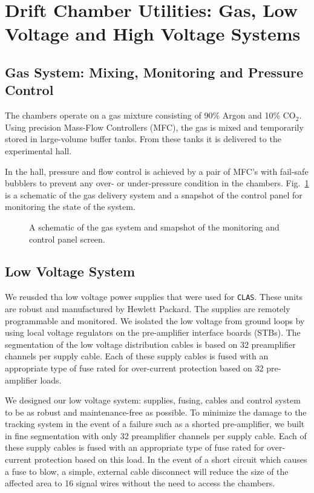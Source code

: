 \section{Drift Chamber Utilities: Gas, Low Voltage and High Voltage Systems}

\subsection{Gas System: Mixing, Monitoring and Pressure Control}

The chambers operate on a gas mixture consisting of 90\% Argon and 10\% CO$_2$.
Using precision Mass-Flow Controllers (MFC), the gas is mixed and temporarily
stored in large-volume buffer tanks.  From these tanks it is delivered
to the experimental hall.  

In the hall, pressure and flow control is achieved by a pair of MFC's with
fail-safe bubblers to prevent any over- or under-pressure condition in
the chambers.  
Fig.~\ref{dc-gas-system} is a schematic of the gas delivery system 
and a snapshot 
of the control panel for monitoring the state of the system.

\begin{figure}[htpb]   
\vspace{4.5cm}
\caption{\small{A schematic of the gas system and smapshot of the monitoring
and control panel screen.}}
\label{dc-gas-system}
\end{figure}   

 
\subsection{Low Voltage System}
We reusded tha low voltage power supplies that were used for {\tt CLAS}.  
These units are robust and manufactured by Hewlett Packard.  
The supplies are remotely programmable and monitored.   We 
isolated the low voltage from 
ground loops by using local voltage regulators on the pre-amplifier interface 
boards (STBs).  The segmentation of the low voltage distribution cables is 
based on 32 preamplifier channels per supply cable.  Each of these supply 
cables is fused with an appropriate type of fuse rated for over-current 
protection based on 32 pre-amplifier loads.  

We designed our low voltage system: supplies, fusing, cables and control
system to be as robust and maintenance-free as possible.  To minimize
the damage to the tracking system in the event of a failure such as
a shorted pre-amplifier, we built in fine segmentation with only
32 preamplifier channels per supply cable.  Each of these supply 
cables is fused with an appropriate type of fuse rated for over-current 
protection based on this load.
In the event of a short circuit which causes a fuse to blow,
a simple, external cable disconnect will reduce the size of the affected
area to 16 signal wires without the need to access the chambers.

